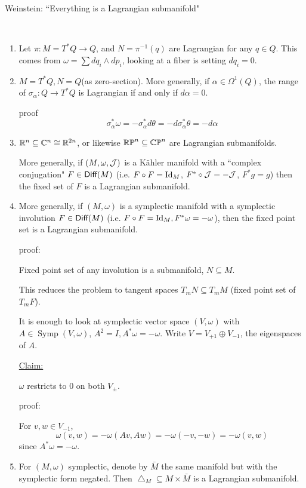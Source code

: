 \documentclass[x11names,reqno,14pt]{extarticle}
\newcommand{\J}{\mc{J}}
\begin{document}
Weinstein: ``Everything is a Lagrangian submanifold"

\exm\,
\begin{enumerate}

\item Let $\pi:M=T^*Q\to Q$, and $N = \pi^{-1}(q)$ are Lagrangian for any $q \in Q$. This comes from $\omega = \sum dq_i \wedge dp_i$, looking at a fiber is setting $dq_i = 0$. 

\item $M = T^*Q, N = Q$(as zero-section). More generally, if $\alpha\in\Omega^1(Q)$, the range of $\sigma_\alpha:Q\to T^*Q$ is Lagrangian if and only if $d\alpha = 0$. 

proof 
\[
\sigma_\alpha^*\omega = -\sigma_\alpha^*d\theta = -d\sigma_\alpha^*\theta = -d\alpha
\]

\item $\mathbb{R}^n \subseteq \mathbb{C}^n \cong \mathbb{R}^{2n}$, or likewise ${\mathbb{RP}}^n\subseteq {\mathbb{CP}}^n$ are Lagrangian submanifolds.

More generally, if $(M,\omega,\J)$ is a K\"ahler manifold with a ``complex conjugation" $F \in {{\text{\sffamily {Diff}}}}(M)$ (i.e. $F\circ F = \operatorname{\mathrm{Id}}_M$, $F^*\circ \J = -\J$, $F^*g = g$) then the fixed set of $F$ is a Lagrangian submanifold. 

\item More generally, if $(M,\omega)$ is a symplectic manifold with a symplectic involution $F\in{{\text{\sffamily {Diff}}}}(M)$ (i.e. $F\circ F = \operatorname{\mathrm{Id}}_M, F^*\omega = -\omega$), then the fixed point set is a Lagrangian submanifold. 

proof: 

Fixed point set of any involution is a submanifold, $N\subseteq M$. 

This reduces the problem to tangent spaces $T_mN\subseteq T_mM$ (fixed point set of $T_mF$). 

It is enough to look at symplectic vector space $(V,\omega)$ with $A \in \operatorname{Symp}(V,\omega)$, $A^2 =I, A^*\omega = -\omega$. Write $V = V_{+1} \oplus V_{-1}$, the eigenspaces of $A$.

\underline{Claim:}

$\omega$ restricts to 0 on both $V_{\pm}$. 

proof: 

For $v, w \in V_{-1}$, 
\[
\omega(v, w) = -\omega(Av,Aw) = -\omega(-v,-w) = -\omega(v, w)
\]
since $A^*\omega=-\omega$. 

\item For $(M,\omega)$ symplectic, denote by $\bar{M}$ the same manifold but with the symplectic form negated. Then $\bigtriangleup_M \subseteq M \times \bar{M}$ is a Lagrangian submanifold. 


\end{enumerate}
\end{document}

